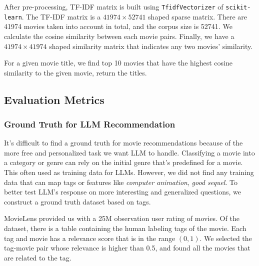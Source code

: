 \documentclass[journal]{IEEEtran}
\theoremstyle{mydefstyle}
\begin{document}

After pre-processing, TF-IDF matrix is built using \texttt{TfidfVectorizer} of \texttt{scikit-learn}. The TF-IDF matrix is a $41974 \times 52741$ shaped sparse matrix. There are 41974 movies taken into account in total, and the corpus size is 52741. We calculate the cosine similarity between each movie pairs. Finally, we have a $41974 \times 41974$ shaped similarity matrix that indicates any two movies' similarity.

For a given movie title, we find top 10 movies that have the highest cosine similarity to the given movie, return the titles.

\subsection{Evaluation Metrics}
\subsubsection{Ground Truth for LLM Recommendation} It's difficult to find a ground truth for movie recommendations because of the more free and personalized task we want LLM to handle. Classifying a movie into a category or genre can rely on the initial genre that's predefined for a movie. This often used as training data for LLMs. However, we did not find any training data that can map tags or features like \textit{computer animation}, \textit{good sequel}. To better test LLM's response on more interesting and generalized questions, we construct a ground truth dataset based on tags.

MovieLens provided us with a 25M observation user rating of movies. Of the dataset, there is a table containing the human labeling tags of the movie. Each tag and movie has a relevance score that is in the range \((0, 1)\). We selected the tag-movie pair whose relevance is higher than 0.5, and found all the movies that are related to the tag.
\end{document}
